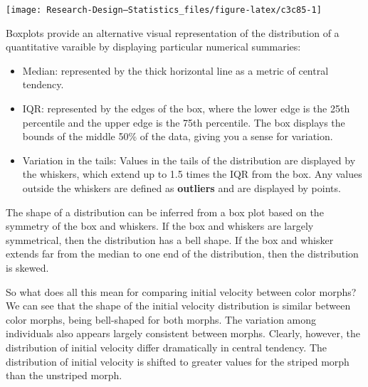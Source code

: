 \documentclass[
]{book}
\newenvironment{Shaded}{\begin{snugshade}}{\end{snugshade}}
\newcommand{\AttributeTok}[1]{\textcolor[rgb]{0.13,0.29,0.53}{#1}}
\newcommand{\FunctionTok}[1]{\textcolor[rgb]{0.13,0.29,0.53}{\textbf{#1}}}
\newcommand{\NormalTok}[1]{#1}
\newcommand{\SpecialCharTok}[1]{\textcolor[rgb]{0.81,0.36,0.00}{\textbf{#1}}}
\newcommand{\StringTok}[1]{\textcolor[rgb]{0.31,0.60,0.02}{#1}}
\begin{document}
\begin{Shaded}
\end{Shaded}

\begin{center}\texttt{[image: Research-Design---Statistics\_files/figure-latex/c3c85-1]} \end{center}

Boxplots provide an alternative visual representation of the distribution of a quantitative varaible by displaying particular numerical summaries:

\begin{itemize}
\item
  Median: represented by the thick horizontal line as a metric of central tendency.
\item
  IQR: represented by the edges of the box, where the lower edge is the 25th percentile and the upper edge is the 75th percentile. The box displays the bounds of the middle 50\% of the data, giving you a sense for variation.
\item
  Variation in the tails: Values in the tails of the distribution are displayed by the whiskers, which extend up to 1.5 times the IQR from the box. Any values outside the whiskers are defined as \textbf{outliers} and are displayed by points.
\end{itemize}

The shape of a distribution can be inferred from a box plot based on the symmetry of the box and whiskers. If the box and whiskers are largely symmetrical, then the distribution has a bell shape. If the box and whisker extends far from the median to one end of the distribution, then the distribution is skewed.

So what does all this mean for comparing initial velocity between color morphs? We can see that the shape of the initial velocity distribution is similar between color morphs, being bell-shaped for both morphs. The variation among individuals also appears largely consistent between morphs. Clearly, however, the distribution of initial velocity differ dramatically in central tendency. The distribution of initial velocity is shifted to greater values for the striped morph than the unstriped morph.
\end{document}
